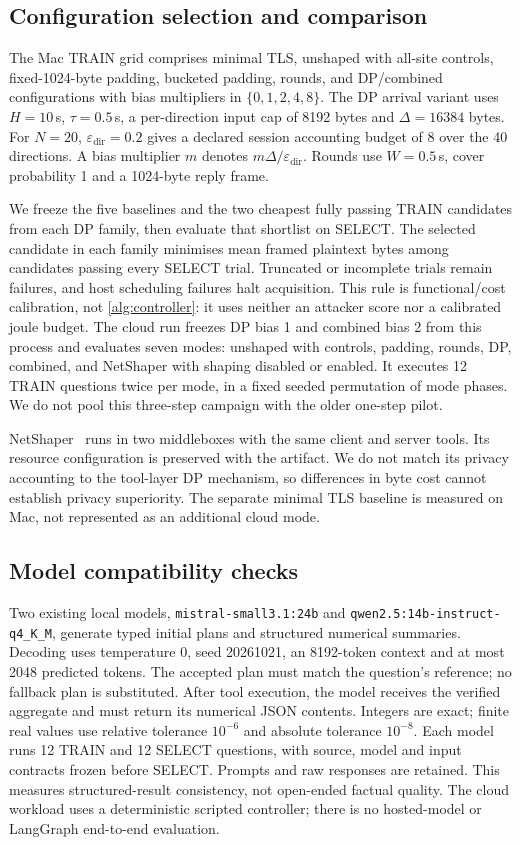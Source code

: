 \subsection{Configuration selection and comparison}
The Mac TRAIN grid comprises minimal TLS, unshaped with all-site controls, fixed-1024-byte padding, bucketed padding, rounds, and DP/combined configurations with bias multipliers in $\{0,1,2,4,8\}$. The DP arrival variant uses $H=10$\,s, $\tau=0.5$\,s, a per-direction input cap of 8192 bytes and $\Delta=16384$ bytes. For $N=20$, $\varepsilon_{\mathrm{dir}}=0.2$ gives a declared session accounting budget of 8 over the 40 directions. A bias multiplier $m$ denotes $m\Delta/\varepsilon_{\mathrm{dir}}$. Rounds use $W=0.5$\,s, cover probability 1 and a 1024-byte reply frame.

We freeze the five baselines and the two cheapest fully passing TRAIN candidates from each DP family, then evaluate that shortlist on SELECT. The selected candidate in each family minimises mean framed plaintext bytes among candidates passing every SELECT trial. Truncated or incomplete trials remain failures, and host scheduling failures halt acquisition. This rule is functional/cost calibration, not \cref{alg:controller}: it uses neither an attacker score nor a calibrated joule budget. The cloud run freezes DP bias 1 and combined bias 2 from this process and evaluates seven modes: unshaped with controls, padding, rounds, DP, combined, and NetShaper with shaping disabled or enabled. It executes 12 TRAIN questions twice per mode, in a fixed seeded permutation of mode phases. We do not pool this three-step campaign with the older one-step pilot.

NetShaper~\cite{sabzi2024netshaper} runs in two middleboxes with the same client and server tools. Its resource configuration is preserved with the artifact. We do not match its privacy accounting to the tool-layer DP mechanism, so differences in byte cost cannot establish privacy superiority. The separate minimal TLS baseline is measured on Mac, not represented as an additional cloud mode.

\subsection{Model compatibility checks}
Two existing local models, \nolinkurl{mistral-small3.1:24b} and \nolinkurl{qwen2.5:14b-instruct-q4_K_M}, generate typed initial plans and structured numerical summaries. Decoding uses temperature 0, seed 20261021, an 8192-token context and at most 2048 predicted tokens. The accepted plan must match the question's reference; no fallback plan is substituted. After tool execution, the model receives the verified aggregate and must return its numerical JSON contents. Integers are exact; finite real values use relative tolerance $10^{-6}$ and absolute tolerance $10^{-8}$. Each model runs 12 TRAIN and 12 SELECT questions, with source, model and input contracts frozen before SELECT. Prompts and raw responses are retained. This measures structured-result consistency, not open-ended factual quality. The cloud workload uses a deterministic scripted controller; there is no hosted-model or LangGraph end-to-end evaluation.

